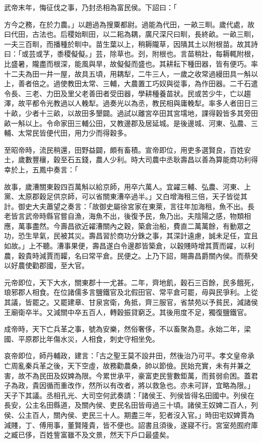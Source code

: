 \begin{pinyinscope}
武帝末年，悔征伐之事，乃封丞相為富民侯。下詔曰：「

方今之務，在於力農。」以趙過為搜粟都尉。過能為代田，一畝三甽。歲代處，故曰代田，古法也。后稷始甽田，以二耜為耦，廣尺深尺曰甽，長終畝。一畝三甽，一夫三百甽，而播種於甽中。苗生葉以上，稍耨隴草，因隤其土以附根苗。故其詩曰：「或芸或芓，黍稷儗儗。」芸，除草也。刭，附根也。言苗稍壯，每耨輒附根，比盛暑，隴盡而根深，能風與旱，故儗儗而盛也。其耕耘下種田器，皆有便巧。率十二夫為田一井一屋，故具五頃，用耦犁，二牛三人，一歲之收常過縵田具一斛以上，善者倍之。過使教田太常、三輔，大農置工巧奴與從事，為作田器。二千石遣令長、三老、力田及里父老善田者受田器，學耕種養苗狀。民或苦少牛，亡以趨澤，故平都令光教過以人輓犁。過奏光以為丞，教民相與庸輓犁。率多人者田日三十畝，少者十三畝，以故田多墾闢。過試以離宮卒田其宮壖地，課得穀皆多其旁田畝一斛以上。令命家田三輔公田，又教邊郡及居延城。是後邊城、河東、弘農、三輔、太常民皆便代田，用力少而得穀多。

至昭帝時，流民稍還，田野益闢，頗有畜積。宣帝即位，用吏多選賢良，百姓安土，歲數豐穰，穀至石五錢，農人少利。時大司農中丞耿壽昌以善為算能商功利得幸於上，五鳳中奏言：「

故事，歲漕關東穀四百萬斛以給京師，用卒六萬人。宜糴三輔、弘農、河東、上黨、太原郡穀足供京師，可以省關東漕卒過半。」又白增海租三倍，天子皆從其計。御史大夫蕭望之奏言：「故御史屬徐宮家在東萊，言往年加海租，魚不出。長老皆言武帝時縣官嘗自漁，海魚不出，後復予民，魚乃出。夫陰陽之感，物類相應，萬事盡然。今壽昌欲近糴漕關內之穀，築倉治船，費直二萬萬餘，有動眾之功，恐生旱氣，民被其災。壽昌習於商功分銖之事，其深計遠慮，誠未足任，宜且如故。」上不聽。漕事果便，壽昌遂白令邊郡皆築倉，以穀賤時增其賈而糴，以利農，穀貴時減賈而糶，名曰常平倉。民便之。上乃下詔，賜壽昌爵關內侯。而蔡癸以好農使勸郡國，至大官。

元帝即位，天下大水，關東郡十一尤甚。二年，齊地飢，穀石三百餘，民多餓死，琅邪郡人相食。在位諸儒多言鹽鐵官及北假田官、常平倉可罷，毋與民爭利。上從其議，皆罷之。又罷建章、甘泉宮衛，角抵，齊三服官，省禁苑以予貧民，減諸侯王廟衛卒半。又減關中卒五百人，轉穀振貸窮乏。其後用度不足，獨復鹽鐵官。

成帝時，天下亡兵革之事，號為安樂，然俗奢侈，不以畜聚為意。永始二年，梁國、平原郡比年傷水災，人相食，刺史守相坐免。

哀帝即位，師丹輔政，建言：「古之聖王莫不設井田，然後治乃可平。孝文皇帝承亡周亂秦兵革之後，天下空虛，故務勸農桑，帥以節儉。民始充實，未有并兼之害，故不為民田及奴婢為限。今累世承平，豪富吏民訾數鉅萬，而貧弱俞困。蓋君子為政，貴因循而重改作，然所以有改者，將以救急也。亦未可詳，宜略為限。」天子下其議。丞相孔光、大司空何武奏請：「諸侯王、列侯皆得名田國中。列侯在長安，公主名田縣道，及關內侯、吏民名田皆毋過三十頃。諸侯王奴婢二百人，列侯、公主百人，關內侯、吏民三十人。期盡三年，犯者沒入官。」時田宅奴婢賈為減賤，丁、傅用事，董賢隆貴，皆不便也。詔書且須後，遂寢不行。宮室苑囿府庫之臧已侈，百姓訾富雖不及文景，然天下戶口最盛矣。


\end{pinyinscope}
